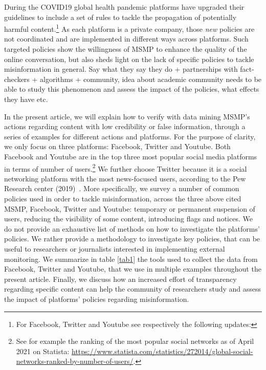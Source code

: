 \documentclass{article}
\begin{document}
\smallskip

During the COVID19 global health pandemic platforms have upgraded their guidelines to include a set of rules to tackle the propagation of potentially harmful content.\footnote{For Facebook, Twitter and Youtube see respectively the following updates: } As each platform is a private company, those {\it new} policies are not coordinated and are implemented in different ways across platforms. Such targeted policies show the willingness of MSMP to enhance the quality of the online conversation, but also sheds light on the lack of specific policies to tackle misinformation in general. {\color{pink} Say what they say they do + partnerships with fact-checkers + algorithms + community,  idea about academic community needs to be able to study this phenomenon and assess the impact of the policies, what effects they have etc.}

\smallskip

In the present article, we will explain how to verify with data mining MSMP's actions regarding content with low credibility or false information, through a series of examples for different actions and platforms. For the purpose of clarity, we only focus on three platforms: Facebook, Twitter and Youtube. Both Facebook and Youtube are in the top three most popular social media platforms in terms of number of users.\footnote{See for example the ranking of the most popular social networks as of April 2021 on Statista: \href{https://www.statista.com/statistics/272014/global-social-networks-ranked-by-number-of-users/}{https://www.statista.com/statistics/272014/global-social-networks-ranked-by-number-of-users/}.} We further choose Twitter because it is a social networking platform with the most news-focused users, according to the Pew Research center (2019)~\cite{pew1}. More specifically, we survey a number of common policies used in order to tackle misinformation, across the three above cited MSMP, Facebook, Twitter and Youtube: temporary or permanent suspension of users, reducing the visibility of some content, introducing flags and notices. We do not provide  an exhaustive list of methods on how to investigate the platforms’ policies. We rather provide a methodology to investigate key policies, that can be useful to researchers or journalists interested in implementing external monitoring. We summarize in table \ref{tab1} the tools used to collect the data from Facebook, Twitter and Youtube, that we use in multiple examples throughout the present article. Finally, we discuss how an increased effort of transparency regarding specific content can help the community of researchers study and assess the impact of platforms' policies regarding misinformation.  %
\end{document}
